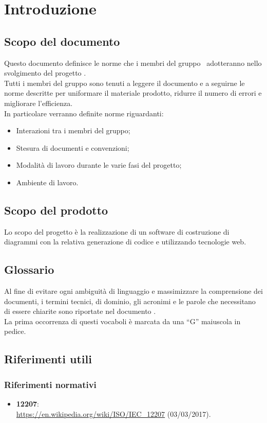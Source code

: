 \documentclass[../NormeDiProgetto.tex]{subfiles}
\begin{document}
	\section{Introduzione}
		\subsection{Scopo del documento}
			Questo documento definisce le norme che i membri del gruppo
			\kaleidoscode\ adotteranno nello svolgimento del progetto
			\progetto.\\
			Tutti i membri del gruppo sono tenuti a leggere il documento
			e a seguirne le norme descritte per uniformare il materiale
			prodotto, ridurre il numero di errori e migliorare l'efficienza.\\
			In particolare verranno definite norme riguardanti:
			\begin{itemize}
				\item Interazioni tra i membri del gruppo;
				\item Stesura di documenti e convenzioni;
				\item Modalità di lavoro durante le varie fasi del progetto;
				\item Ambiente di lavoro.
			\end{itemize}
		\subsection{Scopo del prodotto}
			Lo scopo del progetto è la realizzazione di un software di
			costruzione di diagrammi  con la relativa generazione
			di codice  e  utilizzando tecnologie
			web.
		\subsection{Glossario}
			Al fine di evitare ogni ambiguità di linguaggio e massimizzare la
			comprensione dei documenti, i termini tecnici, di dominio, gli
			acronimi e le parole che necessitano di essere chiarite sono
			riportate nel documento \glossariov.\\
			La prima occorrenza di questi vocaboli è
			marcata da una ``G'' maiuscola in pedice.
		\subsection{Riferimenti utili}
			\subsubsection{Riferimenti normativi}
    			\begin{itemize}
    				\item \textbf{ 12207}:\\
    				\url{https://en.wikipedia.org/wiki/ISO/IEC_12207} (03/03/2017).
				\end{itemize}
\end{document}
